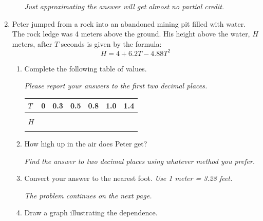 \documentclass[12pt]{article}
\begin{document}
\begin{enumerate}
\begin{enumerate}
\emph{Just approximating the answer will get almost no partial credit.}

\vfill
\vfill
\vfill
\end{enumerate}

\newpage %

\item Peter jumped from a rock into an abandoned mining pit filled with water. The rock ledge was 4 meters above the ground.  His height above the water, $H$ meters, after $T$ seconds is given by the formula: $$H = 4 + 6.2T - 4.88T^2$$

\begin{enumerate}
\item Complete the following table of values.

\emph{Please report your answers to the first two decimal places.}

\begin{center}
\begin{tabular} {|l|c|c|c|c|c|c|} \hline
$T$ & 0 & 0.3 & 0.5 & 0.8 & 1.0 & 1.4 \\ \hline
&&&&&& \\
$H$ & \hspace{.7in} & \hspace{.7in}  & \hspace{.7in}  & \hspace{.7in}  & \hspace{.7in}  & \hspace{.7in}  \\
&&&&&& \\ \hline
\end{tabular}
\end{center}

\item How high up in the air does Peter get?

\emph{Find the answer to two decimal places using whatever method you prefer.}
\vfill
\vfill

\item Convert your answer to the nearest foot.  \emph{Use 1 meter = 3.28 feet.}
\vfill

\hspace{-.5in} \emph{The problem continues on the next page.}

\newpage %

\item Draw a graph illustrating the dependence.


\end{enumerate}
\end{enumerate}
\end{document}
